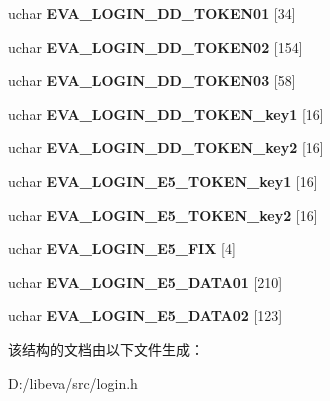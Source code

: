 \begin{DoxyCompactItemize}
\item 
\hypertarget{struct_e_v_aloindata_a524e72c07d54f35f41c988ce279f8ec1}{uchar {\bfseries \-E\-V\-A\-\_\-\-L\-O\-G\-I\-N\-\_\-\-D\-D\-\_\-\-T\-O\-K\-E\-N01} \mbox{[}34\mbox{]}}\label{struct_e_v_aloindata_a524e72c07d54f35f41c988ce279f8ec1}

\item 
\hypertarget{struct_e_v_aloindata_aab2a21139a95b34f4d7641de7c1db298}{uchar {\bfseries \-E\-V\-A\-\_\-\-L\-O\-G\-I\-N\-\_\-\-D\-D\-\_\-\-T\-O\-K\-E\-N02} \mbox{[}154\mbox{]}}\label{struct_e_v_aloindata_aab2a21139a95b34f4d7641de7c1db298}

\item 
\hypertarget{struct_e_v_aloindata_aad1e35ce27c6399f5e105420c9fa107c}{uchar {\bfseries \-E\-V\-A\-\_\-\-L\-O\-G\-I\-N\-\_\-\-D\-D\-\_\-\-T\-O\-K\-E\-N03} \mbox{[}58\mbox{]}}\label{struct_e_v_aloindata_aad1e35ce27c6399f5e105420c9fa107c}

\item 
\hypertarget{struct_e_v_aloindata_a91a29b385ff5fb62a493e74f9ca90e04}{uchar {\bfseries \-E\-V\-A\-\_\-\-L\-O\-G\-I\-N\-\_\-\-D\-D\-\_\-\-T\-O\-K\-E\-N\-\_\-key1} \mbox{[}16\mbox{]}}\label{struct_e_v_aloindata_a91a29b385ff5fb62a493e74f9ca90e04}

\item 
\hypertarget{struct_e_v_aloindata_a292838a425bd81c635ac16b85f5604d6}{uchar {\bfseries \-E\-V\-A\-\_\-\-L\-O\-G\-I\-N\-\_\-\-D\-D\-\_\-\-T\-O\-K\-E\-N\-\_\-key2} \mbox{[}16\mbox{]}}\label{struct_e_v_aloindata_a292838a425bd81c635ac16b85f5604d6}

\item 
\hypertarget{struct_e_v_aloindata_a322cb4fb621ce953ec0148037fbe1693}{uchar {\bfseries \-E\-V\-A\-\_\-\-L\-O\-G\-I\-N\-\_\-\-E5\-\_\-\-T\-O\-K\-E\-N\-\_\-key1} \mbox{[}16\mbox{]}}\label{struct_e_v_aloindata_a322cb4fb621ce953ec0148037fbe1693}

\item 
\hypertarget{struct_e_v_aloindata_acf134c3b27438183d1019ab4177ab2dc}{uchar {\bfseries \-E\-V\-A\-\_\-\-L\-O\-G\-I\-N\-\_\-\-E5\-\_\-\-T\-O\-K\-E\-N\-\_\-key2} \mbox{[}16\mbox{]}}\label{struct_e_v_aloindata_acf134c3b27438183d1019ab4177ab2dc}

\item 
\hypertarget{struct_e_v_aloindata_a1d6aefbdc936762e08ee75b1ac1d9781}{uchar {\bfseries \-E\-V\-A\-\_\-\-L\-O\-G\-I\-N\-\_\-\-E5\-\_\-\-F\-I\-X} \mbox{[}4\mbox{]}}\label{struct_e_v_aloindata_a1d6aefbdc936762e08ee75b1ac1d9781}

\item 
\hypertarget{struct_e_v_aloindata_a8732d32957dcb1b07f2f6f19658289ad}{uchar {\bfseries \-E\-V\-A\-\_\-\-L\-O\-G\-I\-N\-\_\-\-E5\-\_\-\-D\-A\-T\-A01} \mbox{[}210\mbox{]}}\label{struct_e_v_aloindata_a8732d32957dcb1b07f2f6f19658289ad}

\item 
\hypertarget{struct_e_v_aloindata_aab7a85503b453ef8d33ad50bf27530db}{uchar {\bfseries \-E\-V\-A\-\_\-\-L\-O\-G\-I\-N\-\_\-\-E5\-\_\-\-D\-A\-T\-A02} \mbox{[}123\mbox{]}}\label{struct_e_v_aloindata_aab7a85503b453ef8d33ad50bf27530db}

\end{DoxyCompactItemize}


该结构的文档由以下文件生成：\begin{DoxyCompactItemize}
\item 
\-D\-:/libeva/src/login.\-h\end{DoxyCompactItemize}
